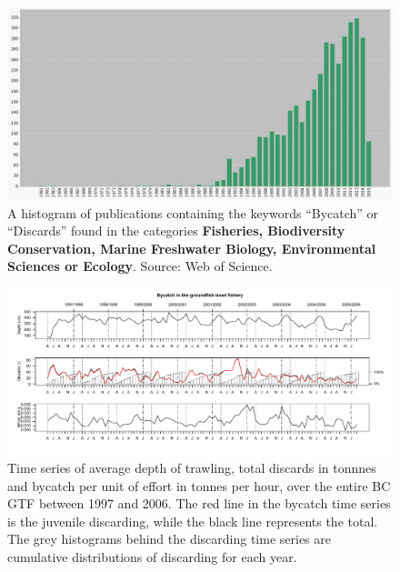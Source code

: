 \documentclass{article}
\begin{document}
\begin{figure}[!h]
\begin{center}
\includegraphics[scale = 0.4]{Images/bdPubsWoS.jpeg}
\end{center}
\caption{ A histogram of publications containing the keywords ``Bycatch'' or ``Discards'' found in the categories {\bf Fisheries, Biodiversity Conservation, Marine Freshwater Biology, Environmental Sciences or Ecology}. Source: Web of Science.}\label{fig:WoSPubRep}
\end{figure}

\begin{figure}[!h]
\begin{center}
\includegraphics[scale = 0.55]{Images/ts.pdf}
\end{center}
\caption{Time series of average depth of trawling, total discards in tonnnes and bycatch per unit of effort in tonnes per hour, over the entire BC GTF between 1997 and 2006. The red line in the bycatch time series is the juvenile discarding, while the black line represents the total. The grey histograms behind the discarding time series are cumulative distributions of discarding for each year.} \label{fig:bycatchTS}
\end{figure}
\end{document}
